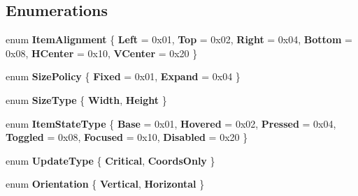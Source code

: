 \subsection*{Enumerations}
\begin{DoxyCompactItemize}
\item 
\mbox{\label{namespace_space_v_i_l_1_1_core_a85087f29b01b9e8031ed98cc9d75b7e2}} 
enum {\bfseries Item\+Alignment} \{ \newline
{\bfseries Left} = 0x01, 
{\bfseries Top} = 0x02, 
{\bfseries Right} = 0x04, 
{\bfseries Bottom} = 0x08, 
\newline
{\bfseries H\+Center} = 0x10, 
{\bfseries V\+Center} = 0x20
 \}
\item 
\mbox{\label{namespace_space_v_i_l_1_1_core_a0a2f860873db7d5aadc3ae6d2b9d6382}} 
enum {\bfseries Size\+Policy} \{ {\bfseries Fixed} = 0x01, 
{\bfseries Expand} = 0x04
 \}
\item 
\mbox{\label{namespace_space_v_i_l_1_1_core_a60809f73d282df8d06753a79682b0938}} 
enum {\bfseries Size\+Type} \{ {\bfseries Width}, 
{\bfseries Height}
 \}
\item 
\mbox{\label{namespace_space_v_i_l_1_1_core_a722f169bf6cd8eff2c3c2824cbbc1c68}} 
enum {\bfseries Item\+State\+Type} \{ \newline
{\bfseries Base} = 0x01, 
{\bfseries Hovered} = 0x02, 
{\bfseries Pressed} = 0x04, 
{\bfseries Toggled} = 0x08, 
\newline
{\bfseries Focused} = 0x10, 
{\bfseries Disabled} = 0x20
 \}
\item 
\mbox{\label{namespace_space_v_i_l_1_1_core_ad3468acb64e95a644ea62bab2cf7e1c2}} 
enum {\bfseries Update\+Type} \{ {\bfseries Critical}, 
{\bfseries Coords\+Only}
 \}
\item 
\mbox{\label{namespace_space_v_i_l_1_1_core_a37ea63bb1ed79991e5674a87584fe7a8}} 
enum {\bfseries Orientation} \{ {\bfseries Vertical}, 
{\bfseries Horizontal}
 \}
\item 
\mbox{\label{namespace_space_v_i_l_1_1_core_a7264660a3c29ff0d57f675b3e94e3f12}} 

\end{DoxyCompactItemize}
